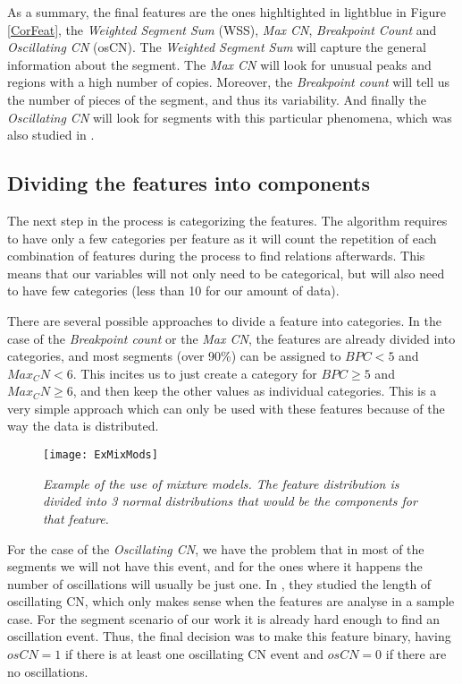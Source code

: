 \documentclass[a4paper]{article}
\begin{document}
As a summary, the final features are the ones highltighted in lightblue in Figure \ref{CorFeat}, the \textit{Weighted Segment Sum} (WSS), \textit{Max CN}, \textit{Breakpoint Count} and \textit{Oscillating CN} (osCN). The \textit{Weighted Segment Sum} will capture the general information about the segment. The \textit{Max CN} will look for unusual peaks and regions with a high number of copies. Moreover, the \textit{Breakpoint count} will tell us the number of pieces of the segment, and thus its variability. And finally the \textit{Oscillating CN} will look for segments with this particular phenomena, which was also studied in \cite{Geoff}. 

\subsection{Dividing the features into components}
The next step in the process is categorizing the features. The algorithm requires to have only a few categories per feature as it will count the repetition of each combination of features during the process to find relations afterwards. This means that our variables will not only need to be categorical, but will also need to have few categories (less than 10 for our amount of data). 

There are several possible approaches to divide a feature into categories. In the case of the \textit{Breakpoint count} or the \textit{Max CN}, the features are already divided into categories, and most segments (over 90\%) can be assigned to $BPC<5$ and $Max_CN<6$. This incites us to just create a category for  $BPC\geq5$ and $Max_CN\geq 6$, and then keep the other values as individual categories. This is a very simple approach which can only be used with these features because of the way the data is distributed. 

\begin{figure}[h] 
	\centering
	\texttt{[image: ExMixMods]} 
	\caption{\textit{Example of the use of mixture models. The feature distribution is divided into 3 normal distributions that would be the components for that feature.}} \label{ExMixMods}
\end{figure}

For the case of the \textit{Oscillating CN}, we have the problem that in most of the segments we will not have this event, and for the ones where it happens the number of oscillations will usually be just one. In \cite{Geoff}, they studied the length of oscillating CN, which only makes sense when the features are analyse in a sample case. For the segment scenario of our work it is already hard enough to find an oscillation event. Thus, the final decision was to make this feature binary, having $osCN=1$ if there is at least one oscillating CN event and $osCN=0$ if there are no oscillations.
\end{document}

